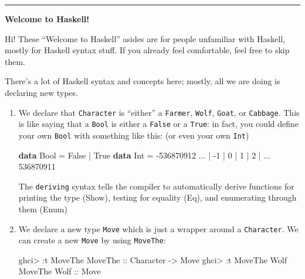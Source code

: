 \documentclass[]{article}
\newenvironment{Shaded}{}{}
\newcommand{\DataTypeTok}[1]{\textcolor[rgb]{0.56,0.13,0.00}{#1}}
\newcommand{\DecValTok}[1]{\textcolor[rgb]{0.25,0.63,0.44}{#1}}
\newcommand{\FunctionTok}[1]{\textcolor[rgb]{0.02,0.16,0.49}{#1}}
\newcommand{\KeywordTok}[1]{\textcolor[rgb]{0.00,0.44,0.13}{\textbf{#1}}}
\newcommand{\NormalTok}[1]{#1}
\newcommand{\OtherTok}[1]{\textcolor[rgb]{0.00,0.44,0.13}{#1}}
\begin{document}
\begin{center}\rule{0.5\linewidth}{\linethickness}\end{center}

\textbf{Welcome to Haskell!}

Hi! These ``Welcome to Haskell'' asides are for people unfamiliar with Haskell,
mostly for Haskell syntax stuff. If you already feel comfortable, feel free to
skip them.

There's a lot of Haskell syntax and concepts here; mostly, all we are doing is
declaring new types.

\begin{enumerate}
\def\labelenumi{\arabic{enumi}.}
\item
  We declare that \texttt{Character} is ``either'' a \texttt{Farmer},
  \texttt{Wolf}, \texttt{Goat}, or \texttt{Cabbage}. This is like saying that a
  \texttt{Bool} is either a \texttt{False} or a \texttt{True}: in fact, you
  could define your own \texttt{Bool} with something like this: (or even your
  own \texttt{Int})

\begin{Shaded}
\begin{Highlighting}[]
\KeywordTok{data} \DataTypeTok{Bool} \FunctionTok{=} \DataTypeTok{False} \FunctionTok{|} \DataTypeTok{True}
\KeywordTok{data} \DataTypeTok{Int} \FunctionTok{=} \FunctionTok{-}\DecValTok{536870912} \FunctionTok{...} \FunctionTok{|} \FunctionTok{-}\DecValTok{1} \FunctionTok{|} \DecValTok{0} \FunctionTok{|} \DecValTok{1} \FunctionTok{|} \DecValTok{2} \FunctionTok{|} \FunctionTok{...} \DecValTok{536870911}
\end{Highlighting}
\end{Shaded}

  The \texttt{deriving} syntax tells the compiler to automatically derive
  functions for printing the type (Show), testing for equality (Eq), and
  enumerating through them (Enum)
\item
  We declare a new type \texttt{Move} which is just a wrapper around a
  \texttt{Character}. We can create a new \texttt{Move} by using
  \texttt{MoveThe}:

\begin{Shaded}
\begin{Highlighting}[]
\NormalTok{ghci}\FunctionTok{>} \FunctionTok{:}\NormalTok{t }\DataTypeTok{MoveThe}
\DataTypeTok{MoveThe}\OtherTok{ ::} \DataTypeTok{Character} \OtherTok{->} \DataTypeTok{Move}
\NormalTok{ghci}\FunctionTok{>} \FunctionTok{:}\NormalTok{t }\DataTypeTok{MoveThe} \DataTypeTok{Wolf}
\DataTypeTok{MoveThe} \DataTypeTok{Wolf}\OtherTok{ ::} \DataTypeTok{Move}
\end{Highlighting}
\end{Shaded}


\end{enumerate}
\end{document}
